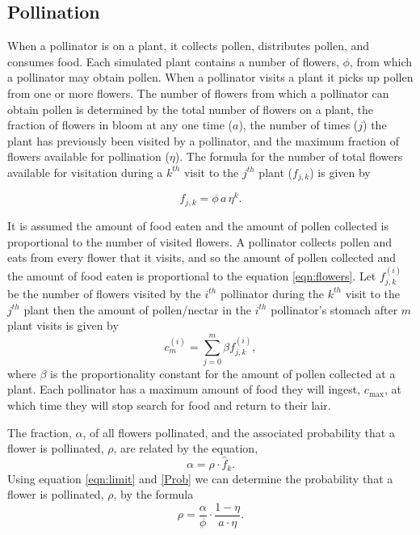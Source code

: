 \subsection{Pollination}
When a pollinator is on a plant, it collects pollen, distributes pollen, and
consumes food. Each simulated plant contains a number of flowers, $\phi$, from
which a pollinator may obtain pollen. When a pollinator visits a plant it
picks up pollen from one or more flowers. The number of flowers from which a
pollinator can obtain pollen is determined by the total number of flowers on a
plant, the fraction of flowers in bloom at any one time ($a$), the number of
times ($j$) the plant has previously been visited by a pollinator, and the
maximum fraction of flowers available for pollination ($\eta$). The formula for
the number of total flowers available for visitation during a $k^{th}$ visit to
the $j^{th}$ plant ($f_{j,k}$) is given by

\begin{equation}
  f_{j,k} = \phi \, a \, \eta^k.
  \label{eqn:flowers}
\end{equation}

It is assumed the amount of food eaten and the amount of pollen collected
is proportional to the number of visited flowers. A pollinator collects pollen
and eats from every flower that it visits, and so the amount of pollen collected
and the amount of food eaten is proportional to the equation \eqref{eqn:flowers}.
Let $f^{\left(i\right)}_{j,k}$ be the number of flowers visited by the $i^{th}$
pollinator during the $k^{th}$ visit to the $j^{th}$ plant then the amount of
pollen/nectar in the $i^{th}$ pollinator's stomach after $m$ plant visits is
given by
\begin{equation}
  c^{\left(i\right)}_m = \sum_{j=0}^{m} \beta f^{\left(i\right)}_{j,k},
  \label{eqn:limit}
\end{equation}
where $\beta$ is the proportionality constant for the amount of pollen collected
at a plant.  Each pollinator has a maximum amount of food they will ingest,
$c_{\text{max}}$, at which time they will stop search for food and return to their
lair. %

The fraction, $\alpha$, of all flowers pollinated, and the associated
probability that a flower is pollinated, $\rho$, are related by the equation,
\begin{equation} \label{Prob} \alpha = \rho \cdot \hat{f}_k.  \end{equation}
Using equation \eqref{eqn:limit} and \eqref{Prob} we can determine the
probability that a flower is pollinated, $\rho$, by the formula
\begin{equation*}
  \rho = \frac{\alpha}{\phi} \cdot \frac{1 - \eta}{a \cdot \eta}.
\end{equation*}

